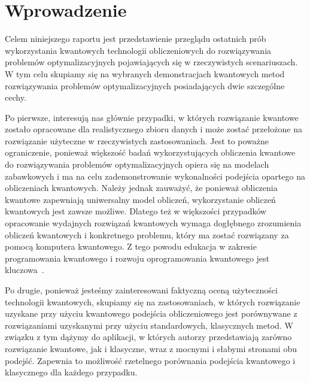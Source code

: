 \documentclass[a4paper,11pt]{article}
\begin{document}

%


\section{Wprowadzenie}

Celem niniejszego raportu jest przedstawienie przeglądu ostatnich prób wykorzystania kwantowych technologii obliczeniowych do rozwiązywania problemów optymalizacyjnych pojawiających się w rzeczywistych scenariuszach. W tym celu skupiamy się na wybranych demonstracjach kwantowych metod rozwiązywania problemów optymalizacyjnych posiadających dwie szczególne cechy.

Po pierwsze, interesują nas głównie przypadki, w których rozwiązanie kwantowe zostało opracowane dla realistycznego zbioru danych i może zostać przełożone na rozwiązanie użyteczne w rzeczywistych zastosowaniach. Jest to poważne ograniczenie, ponieważ większość badań wykorzystujących obliczenia kwantowe do rozwiązywania problemów optymalizacyjnych opiera się na modelach zabawkowych i ma na celu zademonstrowanie wykonalności podejścia opartego na obliczeniach kwantowych. Należy jednak zauważyć, że ponieważ obliczenia kwantowe zapewniają uniwersalny model obliczeń, wykorzystanie obliczeń kwantowych jest zawsze możliwe. Dlatego też w większości przypadków opracowanie wydajnych rozwiązań kwantowych wymaga dogłębnego zrozumienia obliczeń kwantowych i konkretnego problemu, który ma zostać rozwiązany za pomocą komputera kwantowego. Z tego powodu edukacja w zakresie programowania kwantowego i rozwoju oprogramowania kwantowego jest kluczowa~\cite{salehi2022computer}.

Po drugie, ponieważ jesteśmy zainteresowani faktyczną oceną użyteczności technologii kwantowych, skupiamy się na zastosowaniach, w których rozwiązanie uzyskane przy użyciu kwantowego podejścia obliczeniowego jest porównywane z rozwiązaniami uzyskanymi przy użyciu standardowych, klasycznych metod. W związku z tym dążymy do aplikacji, w których autorzy przedstawiają zarówno rozwiązanie kwantowe, jak i klasyczne, wraz z mocnymi i słabymi stronami obu podejść. Zapewnia to możliwość rzetelnego porównania podejścia kwantowego i klasycznego dla każdego przypadku. 
\end{document}
